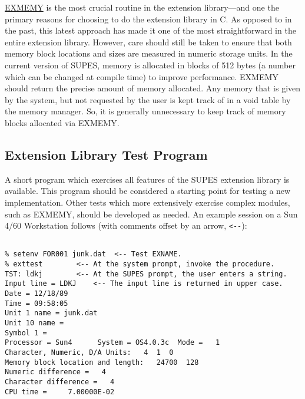 \underline{EXMEMY} is the most crucial routine in the extension
library---and one the primary reasons for choosing to do the extension
library in C.
As opposed to in the past,
this latest approach has made it one of the most straightforward in
the entire extension library.
However, care should still be
taken to ensure that both memory block locations and sizes are measured in
numeric storage units.
In the current version of SUPES,
memory is allocated in blocks of 512 bytes
(a number which can be changed at compile time)
to improve performance.
EXMEMY should return the precise amount of
memory allocated.
Any memory that is given by the system,
but not requested by the user is kept track of in a void table
by the memory manager.
So, it is generally unnecessary to keep track of memory
blocks allocated via EXMEMY.

\subsection{Extension Library Test Program}
A short program which exercises all features of the SUPES extension
library is available.  This program should be considered a starting point
for testing a new implementation.  Other tests which more extensively
exercise complex modules, such as EXMEMY, should be developed as needed.
An example session on a Sun 4/60 Workstation follows (with comments offset by
an arrow, \verb+<--+):
\begin{verbatim}

% setenv FOR001 junk.dat  <-- Test EXNAME.
% exttest        <-- At the system prompt, invoke the procedure.
TST: ldkj        <-- At the SUPES prompt, the user enters a string.
Input line = LDKJ    <-- The input line is returned in upper case.
Date = 12/18/89
Time = 09:58:05
Unit 1 name = junk.dat 
Unit 10 name =  
Symbol 1 =  
Processor = Sun4      System = OS4.0.3c  Mode =   1
Character, Numeric, D/A Units:   4  1  0
Memory block location and length:   24700  128
Numeric difference =   4
Character difference =   4
CPU time =     7.00000E-02

\end{verbatim}

